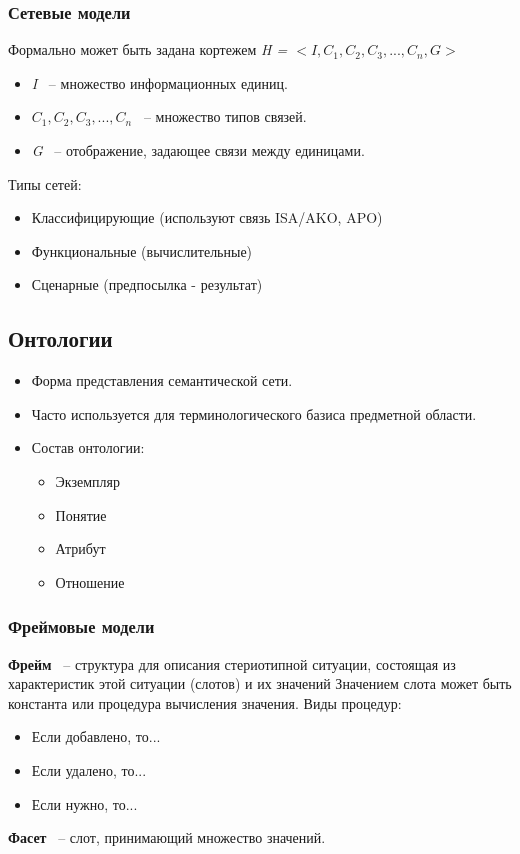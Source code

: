 \documentclass{article}
\begin{document}
\subsubsection{Сетевые модели}
Формально может быть задана кортежем \textit{H = $<I, C_1, C_2, C_3, ..., C_n, G>$}
\begin{itemize}
    \item \textit{I} ~-- множество информационных единиц.
    \item \textit{$C_1, C_2, C_3, ..., C_n$} ~-- множество типов связей.
    \item \textit{G} ~-- отображение, задающее связи между единицами.
\end{itemize}
Типы сетей: 
\begin{itemize}
    \item Классифицирующие (используют связь ISA/AKO, APO)
    \item Функциональные (вычислительные)
    \item Сценарные (предпосылка - результат)
\end{itemize}

\subsection{Онтологии}
\begin{itemize}
    \item Форма представления семантической сети.
    \item Часто используется для терминологического базиса предметной области.
    \item Состав онтологии:
    \begin{itemize}
        \item Экземпляр
        \item Понятие
        \item Атрибут
        \item Отношение
    \end{itemize}
\end{itemize}

\subsubsection{Фреймовые модели}
\textbf{Фрейм} ~-- структура для описания стериотипной ситуации, состоящая из характеристик этой ситуации (слотов) и их значений
\newline
Значением слота может быть константа или процедура вычисления значения.
\newline
Виды процедур:
\begin{itemize}
    \item Если добавлено, то...
    \item Если удалено, то...
    \item Если нужно, то...
\end{itemize}
\textbf{Фасет} ~-- слот, принимающий множество значений.
\end{document}
